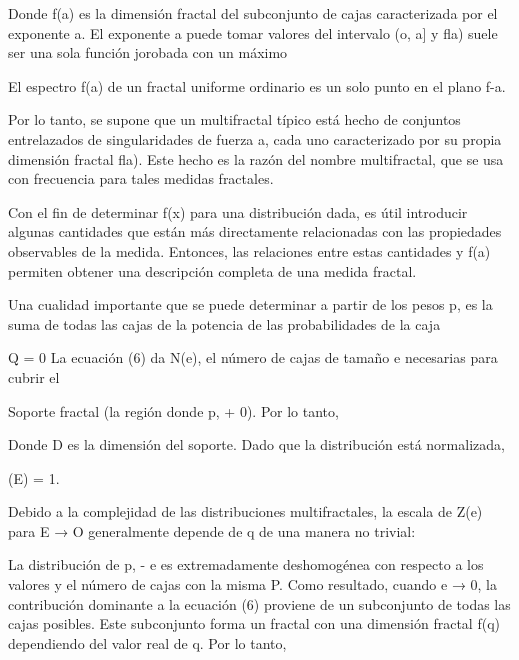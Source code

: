 \documentclass[11pt]{article}
\begin{document}



Donde f(a) es la dimensión fractal del subconjunto de cajas caracterizada por el exponente a. El exponente a puede tomar valores del intervalo (o, a] y fla) suele ser una sola función jorobada con un máximo





El espectro f(a) de un fractal uniforme ordinario es un solo punto en el plano f-a.

Por lo tanto, se supone que un multifractal típico está hecho de conjuntos entrelazados de singularidades de fuerza a, cada uno caracterizado por su propia dimensión fractal fla). Este hecho es la razón del nombre multifractal, que se usa con frecuencia para tales medidas fractales.



Con el fin de determinar f(x) para una distribución dada, es útil introducir algunas cantidades que están más directamente relacionadas con las propiedades observables de la medida. Entonces, las relaciones entre estas cantidades y f(a) permiten obtener una descripción completa de una medida fractal.

Una cualidad importante que se puede determinar a partir de los pesos p, es la suma de todas las cajas de la potencia de las probabilidades de la caja


Q = 0 La ecuación (6) da N(e), el número de cajas de tamaño e necesarias para cubrir el

Soporte fractal (la región donde p, + 0). Por lo tanto,

Donde D es la dimensión del soporte. Dado que la distribución está normalizada,

(E) = 1.

Debido a la complejidad de las distribuciones multifractales, la escala de Z(e) para E → O generalmente depende de q de una manera no trivial:

La distribución de p, - e es extremadamente deshomogénea con respecto a los valores y el número de cajas con la misma P. Como resultado, cuando e → 0, la contribución dominante a la ecuación (6) proviene de un subconjunto de todas las cajas posibles. Este subconjunto forma un fractal con una dimensión fractal f(q) dependiendo del valor real de q. Por lo tanto,
\end{document}
